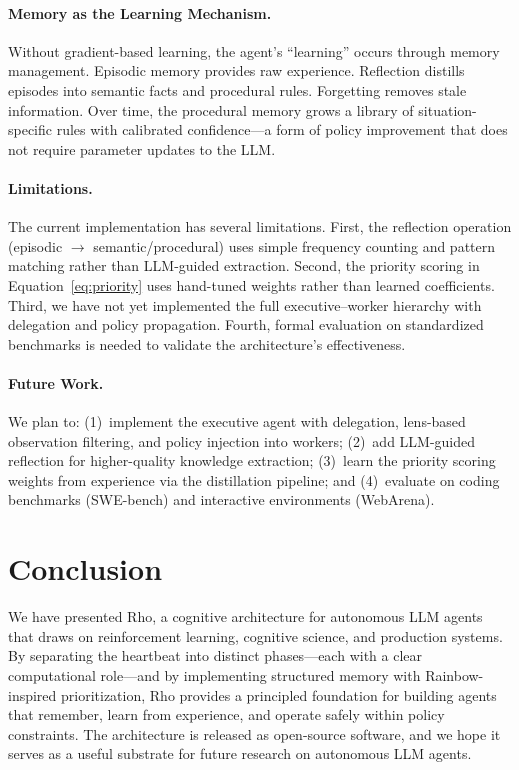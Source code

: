\documentclass[letterpaper]{article}
\begin{document}
\paragraph{Memory as the Learning Mechanism.}
Without gradient-based learning, the agent's ``learning'' occurs through memory management. Episodic memory provides raw experience. Reflection distills episodes into semantic facts and procedural rules. Forgetting removes stale information. Over time, the procedural memory grows a library of situation-specific rules with calibrated confidence---a form of policy improvement that does not require parameter updates to the LLM.

\paragraph{Limitations.}
The current implementation has several limitations. First, the reflection operation (episodic $\rightarrow$ semantic/procedural) uses simple frequency counting and pattern matching rather than LLM-guided extraction. Second, the priority scoring in Equation~\ref{eq:priority} uses hand-tuned weights rather than learned coefficients. Third, we have not yet implemented the full executive--worker hierarchy with delegation and policy propagation. Fourth, formal evaluation on standardized benchmarks is needed to validate the architecture's effectiveness.

\paragraph{Future Work.}
We plan to: (1)~implement the executive agent with delegation, lens-based observation filtering, and policy injection into workers; (2)~add LLM-guided reflection for higher-quality knowledge extraction; (3)~learn the priority scoring weights from experience via the distillation pipeline; and (4)~evaluate on coding benchmarks (SWE-bench) and interactive environments (WebArena).


\section{Conclusion}

We have presented Rho, a cognitive architecture for autonomous LLM agents that draws on reinforcement learning, cognitive science, and production systems. By separating the heartbeat into distinct phases---each with a clear computational role---and by implementing structured memory with Rainbow-inspired prioritization, Rho provides a principled foundation for building agents that remember, learn from experience, and operate safely within policy constraints. The architecture is released as open-source software, and we hope it serves as a useful substrate for future research on autonomous LLM agents.
\end{document}
